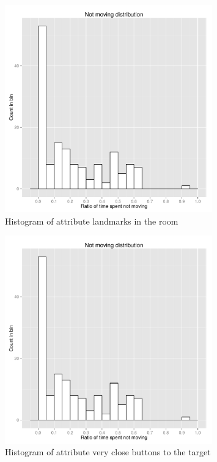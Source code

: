 \begin{figure}[!htbp]
  \centering
	\includegraphics[page=5,width=0.8\textwidth]{Images/chains_features_ML}
	\caption{Histogram of attribute landmarks in the room}
	\label{fig:chains-distrib-landmarks}
\end{figure}

\begin{figure}[!htbp]
  \centering
	\includegraphics[page=6,width=0.8\textwidth]{Images/chains_features_ML}
	\caption{Histogram of attribute very close buttons to the target}
	\label{fig:chains-distrib-veryclose}
\end{figure}

